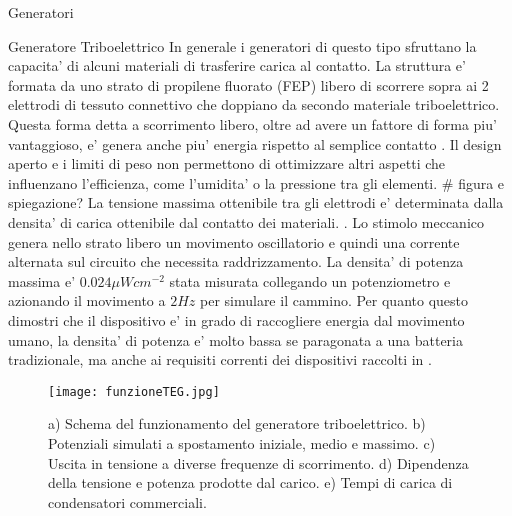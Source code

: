 \begin{section}{Generatori}
    \begin{subsection}{Generatore Triboelettrico}
        In generale i generatori di questo tipo sfruttano la capacita' di alcuni materiali di trasferire carica al contatto. La struttura e' formata da uno strato di propilene fluorato (FEP) libero di scorrere sopra ai 2 elettrodi di tessuto connettivo che doppiano da secondo materiale triboelettrico. Questa forma detta a scorrimento libero, oltre ad avere un fattore di forma piu' vantaggioso, e' genera anche piu' energia rispetto al semplice contatto \cite{fuAchievingUltraDurabilityHigh2024}. Il design aperto e i limiti di peso non permettono di ottimizzare altri aspetti che influenzano l'efficienza, come l'umidita' o la pressione tra gli elementi.
        \# figura e spiegazione?
        La tensione massima ottenibile tra gli elettrodi e' determinata dalla densita' di carica ottenibile dal contatto dei materiali. . Lo stimolo meccanico genera nello strato libero un movimento oscillatorio e quindi una corrente alternata sul circuito che necessita raddrizzamento. La densita' di potenza massima e' \(0.024\mu Wcm^{-2}\) stata misurata collegando un potenziometro e azionando il movimento a \(2Hz\) per simulare il cammino. Per quanto questo dimostri che il dispositivo e' in grado di raccogliere energia dal movimento umano, la densita' di potenza e' molto bassa se paragonata a una batteria tradizionale, ma anche ai requisiti correnti dei dispositivi raccolti in \cite{AdvancedEnergyHarvesters}.
        \begin{figure}[hbt!]
            \texttt{[image: funzioneTEG.jpg]}
            \centering
            \caption{a) Schema del funzionamento del generatore triboelettrico. b) Potenziali simulati a spostamento iniziale, medio e massimo. c) Uscita in tensione a diverse frequenze di scorrimento. d) Dipendenza della tensione e potenza prodotte dal carico. e) Tempi di carica di condensatori commerciali.}
        \end{figure}
    \end{subsection}
    

\end{section}

